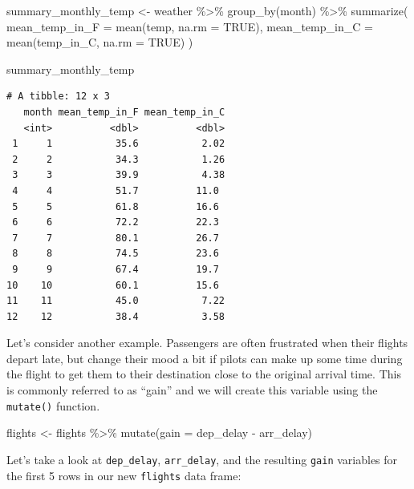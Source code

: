 \documentclass[
  letterpaper,
  DIV=11,
  numbers=noendperiod]{scrreprt}
\newenvironment{Shaded}{\begin{snugshade}}{\end{snugshade}}
\newcommand{\AttributeTok}[1]{\textcolor[rgb]{0.40,0.45,0.13}{#1}}
\newcommand{\ConstantTok}[1]{\textcolor[rgb]{0.56,0.35,0.01}{#1}}
\newcommand{\FunctionTok}[1]{\textcolor[rgb]{0.28,0.35,0.67}{#1}}
\newcommand{\NormalTok}[1]{\textcolor[rgb]{0.00,0.23,0.31}{#1}}
\newcommand{\OtherTok}[1]{\textcolor[rgb]{0.00,0.23,0.31}{#1}}
\newcommand{\SpecialCharTok}[1]{\textcolor[rgb]{0.37,0.37,0.37}{#1}}
\theoremstyle{definition}
\theoremstyle{remark}
\begin{document}
\begin{Shaded}
\begin{Highlighting}[]
\NormalTok{summary\_monthly\_temp }\OtherTok{\textless{}{-}}\NormalTok{ weather }\SpecialCharTok{\%\textgreater{}\%} 
  \FunctionTok{group\_by}\NormalTok{(month) }\SpecialCharTok{\%\textgreater{}\%} 
  \FunctionTok{summarize}\NormalTok{(}
    \AttributeTok{mean\_temp\_in\_F =} \FunctionTok{mean}\NormalTok{(temp, }\AttributeTok{na.rm =} \ConstantTok{TRUE}\NormalTok{), }
    \AttributeTok{mean\_temp\_in\_C =} \FunctionTok{mean}\NormalTok{(temp\_in\_C, }\AttributeTok{na.rm =} \ConstantTok{TRUE}\NormalTok{)}
\NormalTok{    )}

\NormalTok{summary\_monthly\_temp}
\end{Highlighting}
\end{Shaded}

\begin{verbatim}
# A tibble: 12 x 3
   month mean_temp_in_F mean_temp_in_C
   <int>          <dbl>          <dbl>
 1     1           35.6           2.02
 2     2           34.3           1.26
 3     3           39.9           4.38
 4     4           51.7          11.0 
 5     5           61.8          16.6 
 6     6           72.2          22.3 
 7     7           80.1          26.7 
 8     8           74.5          23.6 
 9     9           67.4          19.7 
10    10           60.1          15.6 
11    11           45.0           7.22
12    12           38.4           3.58
\end{verbatim}

Let's consider another example. Passengers are often frustrated when
their flights depart late, but change their mood a bit if pilots can
make up some time during the flight to get them to their destination
close to the original arrival time. This is commonly referred to as
``gain'' and we will create this variable using the \texttt{mutate()}
function.

\begin{Shaded}
\begin{Highlighting}[]
\NormalTok{flights }\OtherTok{\textless{}{-}}\NormalTok{ flights }\SpecialCharTok{\%\textgreater{}\%} 
  \FunctionTok{mutate}\NormalTok{(}\AttributeTok{gain =}\NormalTok{ dep\_delay }\SpecialCharTok{{-}}\NormalTok{ arr\_delay)}
\end{Highlighting}
\end{Shaded}

Let's take a look at \texttt{dep\_delay}, \texttt{arr\_delay}, and the
resulting \texttt{gain} variables for the first 5 rows in our new
\texttt{flights} data frame:
\end{document}
